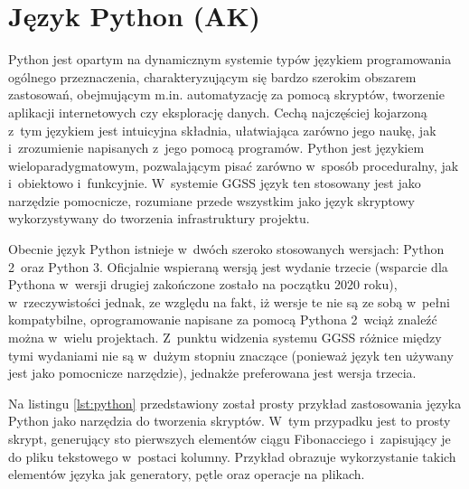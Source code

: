 \section{Język Python (AK)}
Python \cite{Python_main} \cite{Lutz} jest opartym na dynamicznym systemie typów językiem programowania ogólnego przeznaczenia, charakteryzującym się bardzo szerokim obszarem zastosowań, obejmującym m.in. automatyzację za pomocą skryptów, tworzenie aplikacji internetowych czy eksplorację danych. Cechą najczęściej kojarzoną z~tym językiem jest intuicyjna składnia, ułatwiająca zarówno jego naukę, jak i~zrozumienie napisanych z~jego pomocą programów. Python jest językiem wieloparadygmatowym, pozwalającym pisać zarówno w~sposób proceduralny, jak i~obiektowo i~funkcyjnie. W~systemie GGSS język ten stosowany jest jako narzędzie pomocnicze, rozumiane przede wszystkim jako język skryptowy wykorzystywany do tworzenia infrastruktury projektu.

Obecnie język Python istnieje w~dwóch szeroko stosowanych wersjach: Python 2~oraz Python 3. Oficjalnie wspieraną wersją jest wydanie trzecie (wsparcie dla Pythona w~wersji drugiej zakończone zostało na początku 2020 roku), w~rzeczywistości jednak, ze względu na fakt, iż wersje te nie są ze sobą w~pełni kompatybilne, oprogramowanie napisane za pomocą Pythona 2~wciąż znaleźć można w~wielu projektach. Z~punktu widzenia systemu GGSS różnice między tymi wydaniami nie są w~dużym stopniu znaczące (ponieważ język ten używany jest jako pomocnicze narzędzie), jednakże preferowana jest wersja trzecia.

Na listingu \ref{lst:python} przedstawiony został prosty przykład zastosowania języka Python jako narzędzia do tworzenia skryptów. W~tym przypadku jest to prosty skrypt, generujący sto pierwszych elementów ciągu Fibonacciego i~zapisujący je do pliku tekstowego w~postaci kolumny. Przykład obrazuje wykorzystanie takich elementów języka jak generatory, pętle oraz operacje na plikach.





